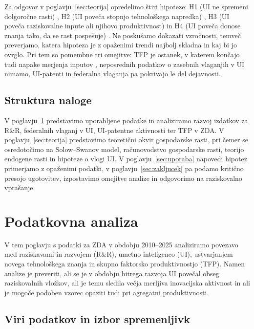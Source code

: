 \documentclass[12pt,a4paper]{article}
\begin{document}
Za odgovor v poglavju~\ref{sec:teorija} opredelimo štiri hipoteze: H1 (UI ne spremeni dolgoročne rasti) \parencite[str.~13]{polanec_rast}, H2 (UI poveča stopnjo tehnološkega napredka) \parencites[str.~14--15]{polanec_rast}[str.~108--109]{garin2021}, H3 (UI poveča raziskovalne inpute ali njihovo produktivnost) \parencite[str.~27--28]{polanec_rast} in H4 (UI poveča donose znanja tako, da se rast pospešuje) \parencite[str.~26--27]{polanec_rast}. Ne poskušamo dokazati vzročnosti, temveč preverjamo, katera hipoteza je z opaženimi trendi najbolj skladna in kaj bi jo ovrglo. Pri tem so pomembne tri omejitve: TFP je ostanek, v katerem končajo tudi napake merjenja inputov \parencite[str.~23--24]{polanec_rast}, neposrednih podatkov o zasebnih vlaganjih v UI nimamo, UI-patenti in federalna vlaganja pa pokrivajo le del dejavnosti.

\subsection{Struktura naloge}
V poglavju~\ref{sec:podatki} predstavimo uporabljene podatke in analiziramo razvoj izdatkov za R\&R, federalnih vlaganj v UI, UI-patentne aktivnosti ter TFP v ZDA. V poglavju~\ref{sec:teorija} predstavimo teoretični okvir gospodarske rasti, pri čemer se osredotočimo na Solow--Swanov model, računovodstvo gospodarske rasti, teorijo endogene rasti in hipoteze o vlogi UI. V poglavju~\ref{sec:uporaba} napovedi hipotez primerjamo z opaženimi podatki, v poglavju~\ref{sec:zakljucek} pa podamo kritično presojo ugotovitev, izpostavimo omejitve analize in odgovorimo na raziskovalno vprašanje.

\section{Podatkovna analiza}\label{sec:podatki}

V tem poglavju s podatki za ZDA v obdobju 2010--2025 analiziramo povezavo med raziskavami in razvojem (R\&R), umetno inteligenco (UI), ustvarjanjem novega tehnološkega znanja in skupno faktorsko produktivnostjo (TFP). Namen analize je preveriti, ali se je v obdobju hitrega razvoja UI povečal obseg raziskovalnih vložkov, ali je temu sledila večja merljiva inovacijska aktivnost in ali je mogoče podoben vzorec opaziti tudi pri agregatni produktivnosti.

\subsection{Viri podatkov in izbor spremenljivk}
\end{document}
